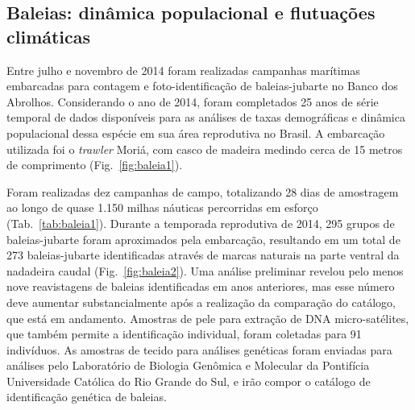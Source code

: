 \subsection{Baleias: dinâmica populacional e flutuações climáticas} %
\label{sec:dinam-popul-de} 

Entre julho e novembro de 2014 foram realizadas campanhas marítimas
embarcadas para contagem e foto-identificação de baleias-jubarte no
Banco dos Abrolhos. Considerando o ano de 2014, foram completados 25
anos de série temporal de dados disponíveis para as análises de taxas
demográficas e dinâmica populacional dessa espécie em sua área
reprodutiva no Brasil. A embarcação utilizada foi o \textit{trawler}
Moriá, com casco de madeira medindo cerca de 15 metros de comprimento
(Fig.~\ref{fig:baleia1}).

Foram realizadas dez campanhas de campo, totalizando 28 dias de
amostragem ao longo de quase 1.150 milhas náuticas percorridas em
esforço (Tab.~\ref{tab:baleia1}). Durante a temporada reprodutiva de 2014,
295 grupos de baleias-jubarte foram aproximados pela embarcação,
resultando em um total de 273 baleias-jubarte identificadas através de
marcas naturais na parte ventral da nadadeira caudal (Fig.~\ref{fig:baleia2}). 
Uma análise preliminar revelou pelo menos nove reavistagens de
baleias identificadas em anos anteriores, mas esse número deve
aumentar substancialmente após a realização da comparação do catálogo,
que está em andamento. Amostras de pele para extração de DNA
micro-satélites, que também permite a identificação individual, foram
coletadas para 91 indivíduos. As amostras de tecido para análises
genéticas foram enviadas para análises pelo Laboratório de Biologia
Genômica e Molecular da Pontifícia Universidade Católica do Rio Grande
do Sul, e irão compor o catálogo de identificação genética de baleias.

